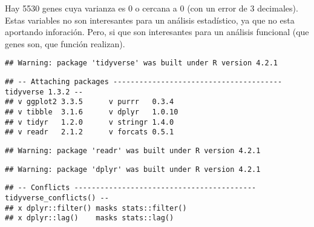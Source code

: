 \documentclass[
]{article}
\newenvironment{Shaded}{\begin{snugshade}}{\end{snugshade}}
\newcommand{\CommentTok}[1]{\textcolor[rgb]{0.56,0.35,0.01}{\textit{#1}}}
\newcommand{\DecValTok}[1]{\textcolor[rgb]{0.00,0.00,0.81}{#1}}
\newcommand{\FunctionTok}[1]{\textcolor[rgb]{0.00,0.00,0.00}{#1}}
\newcommand{\NormalTok}[1]{#1}
\newcommand{\OtherTok}[1]{\textcolor[rgb]{0.56,0.35,0.01}{#1}}
\newcommand{\SpecialCharTok}[1]{\textcolor[rgb]{0.00,0.00,0.00}{#1}}
\newcommand{\StringTok}[1]{\textcolor[rgb]{0.31,0.60,0.02}{#1}}
\begin{document}
Hay 5530 genes cuya varianza es 0 o cercana a 0 (con un error de 3
decimales). Estas variables no son interesantes para un análisis
estadístico, ya que no esta aportando inforación. Pero, si que son
interesantes para un análisis funcional (que genes son, que función
realizan).

\begin{Shaded}
\end{Shaded}

\begin{verbatim}
## Warning: package 'tidyverse' was built under R version 4.2.1
\end{verbatim}

\begin{verbatim}
## -- Attaching packages --------------------------------------- tidyverse 1.3.2 --
## v ggplot2 3.3.5      v purrr   0.3.4 
## v tibble  3.1.6      v dplyr   1.0.10
## v tidyr   1.2.0      v stringr 1.4.0 
## v readr   2.1.2      v forcats 0.5.1
\end{verbatim}

\begin{verbatim}
## Warning: package 'readr' was built under R version 4.2.1
\end{verbatim}

\begin{verbatim}
## Warning: package 'dplyr' was built under R version 4.2.1
\end{verbatim}

\begin{verbatim}
## -- Conflicts ------------------------------------------ tidyverse_conflicts() --
## x dplyr::filter() masks stats::filter()
## x dplyr::lag()    masks stats::lag()
\end{verbatim}

\begin{Shaded}
\end{Shaded}
\end{document}
